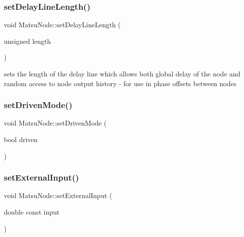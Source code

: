 \mbox{\label{classMatsuNode_a6b5b32c4489129fd184638a9c9ed36d4}} 
\subsubsection{\texorpdfstring{set\+Delay\+Line\+Length()}{setDelayLineLength()}}
{\footnotesize\ttfamily void Matsu\+Node\+::set\+Delay\+Line\+Length (\begin{DoxyParamCaption}\item[{unsigned}]{length }\end{DoxyParamCaption})}

sets the length of the delay line which allows both global delay of the node and random access to node output history -\/ for use in phase offsets between nodes \mbox{\label{classMatsuNode_a62c5dce090102df22142da5cdad313e1}} 
\subsubsection{\texorpdfstring{set\+Driven\+Mode()}{setDrivenMode()}}
{\footnotesize\ttfamily void Matsu\+Node\+::set\+Driven\+Mode (\begin{DoxyParamCaption}\item[{bool}]{driven }\end{DoxyParamCaption})}

\mbox{\label{classMatsuNode_af1538d4e992122d520e221332f05a53e}} 
\subsubsection{\texorpdfstring{set\+External\+Input()}{setExternalInput()}}
{\footnotesize\ttfamily void Matsu\+Node\+::set\+External\+Input (\begin{DoxyParamCaption}\item[{double const}]{input }\end{DoxyParamCaption})}



